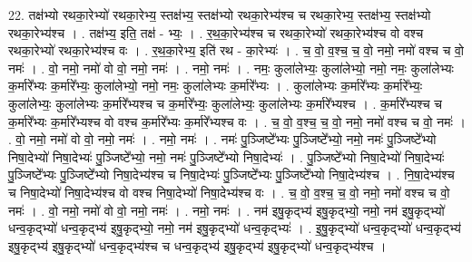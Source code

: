 \documentclass[17pt]{extarticle}
\begin{document}
22. तक्ष॑भ्यो रथका॒रेभ्यो॑ रथका॒रेभ्य॒ स्तक्ष॑भ्य॒ स्तक्ष॑भ्यो रथका॒रेभ्य॑श्च च रथका॒रेभ्य॒ स्तक्ष॑भ्य॒ स्तक्ष॑भ्यो रथका॒रेभ्य॑श्च । . तक्ष॑भ्य॒ इति॒ तक्ष॑ - भ्यः॒ । . र॒थ॒का॒रेभ्य॑श्च च रथका॒रेभ्यो॑ रथका॒रेभ्य॑श्च वो वश्च रथका॒रेभ्यो॑ रथका॒रेभ्य॑श्च वः । . र॒थ॒का॒रेभ्य॒ इति॑ रथ - का॒रेभ्यः॑ । . च॒ वो॒ व॒श्च॒ च॒ वो॒ नमो॒ नमो॑ वश्च च वो॒ नमः॑ । . वो॒ नमो॒ नमो॑ वो वो॒ नमो॒ नमः॑ । . नमो॒ नमः॑ । . नमः॒ कुला॑लेभ्यः॒ कुला॑लेभ्यो॒ नमो॒ नमः॒ कुला॑लेभ्यः क॒र्मारे᳚भ्यः क॒र्मारे᳚भ्यः॒ कुला॑लेभ्यो॒ नमो॒ नमः॒ कुला॑लेभ्यः क॒र्मारे᳚भ्यः । . कुला॑लेभ्यः क॒र्मारे᳚भ्यः क॒र्मारे᳚भ्यः॒ कुला॑लेभ्यः॒ कुला॑लेभ्यः क॒र्मारे᳚भ्यश्च च क॒र्मारे᳚भ्यः॒ कुला॑लेभ्यः॒ कुला॑लेभ्यः क॒र्मारे᳚भ्यश्च । . क॒र्मारे᳚भ्यश्च च क॒र्मारे᳚भ्यः क॒र्मारे᳚भ्यश्च वो वश्च क॒र्मारे᳚भ्यः क॒र्मारे᳚भ्यश्च वः । . च॒ वो॒ व॒श्च॒ च॒ वो॒ नमो॒ नमो॑ वश्च च वो॒ नमः॑ । . वो॒ नमो॒ नमो॑ वो वो॒ नमो॒ नमः॑ । . नमो॒ नमः॑ । . नमः॑ पु॒ञ्जिष्टे᳚भ्यः पु॒ञ्जिष्टे᳚भ्यो॒ नमो॒ नमः॑ पु॒ञ्जिष्टे᳚भ्यो निषा॒देभ्यो॑ निषा॒देभ्यः॑ पु॒ञ्जिष्टे᳚भ्यो॒ नमो॒ नमः॑ पु॒ञ्जिष्टे᳚भ्यो निषा॒देभ्यः॑ । . पु॒ञ्जिष्टे᳚भ्यो निषा॒देभ्यो॑ निषा॒देभ्यः॑ पु॒ञ्जिष्टे᳚भ्यः पु॒ञ्जिष्टे᳚भ्यो निषा॒देभ्य॑श्च च निषा॒देभ्यः॑ पु॒ञ्जिष्टे᳚भ्यः पु॒ञ्जिष्टे᳚भ्यो निषा॒देभ्य॑श्च । . नि॒षा॒देभ्य॑श्च च निषा॒देभ्यो॑ निषा॒देभ्य॑श्च वो वश्च निषा॒देभ्यो॑ निषा॒देभ्य॑श्च वः । . च॒ वो॒ व॒श्च॒ च॒ वो॒ नमो॒ नमो॑ वश्च च वो॒ नमः॑ । . वो॒ नमो॒ नमो॑ वो वो॒ नमो॒ नमः॑ । . नमो॒ नमः॑ । . नम॑ इषु॒कृद्भ्य॑ इषु॒कृद्भ्यो॒ नमो॒ नम॑ इषु॒कृद्भ्यो॑ धन्व॒कृद्भ्यो॑ धन्व॒कृद्भ्य॑ इषु॒कृद्भ्यो॒ नमो॒ नम॑ इषु॒कृद्भ्यो॑ धन्व॒कृद्भ्यः॑ । . इ॒षु॒कृद्भ्यो॑ धन्व॒कृद्भ्यो॑ धन्व॒कृद्भ्य॑ इषु॒कृद्भ्य॑ इषु॒कृद्भ्यो॑ धन्व॒कृद्भ्य॑श्च च धन्व॒कृद्भ्य॑ इषु॒कृद्भ्य॑ इषु॒कृद्भ्यो॑ धन्व॒कृद्भ्य॑श्च । \newline
\end{document}
